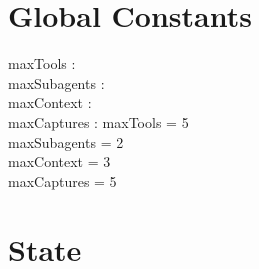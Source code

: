 \documentclass[a4paper,10pt,fleqn]{article}
\begin{document}
\section{Global Constants}

\begin{axdef}
  maxTools : \nat \\
  maxSubagents : \nat \\
  maxContext : \nat \\
  maxCaptures : \nat
  \where
  maxTools = 5 \\
  maxSubagents = 2 \\
  maxContext = 3 \\
  maxCaptures = 5
\end{axdef}

\section{State}
\end{document}
